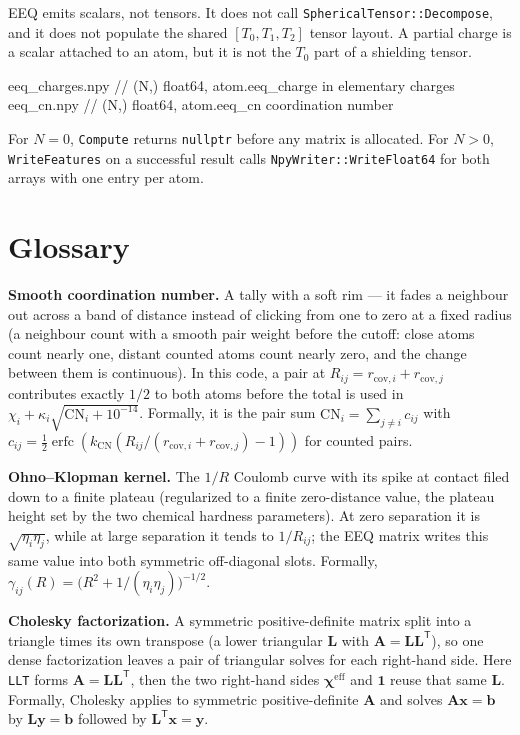 \documentclass[11pt]{article}
\newcommand{\code}[1]{\texttt{#1}}
\begin{document}
EEQ emits scalars, not tensors. It does not call
\code{SphericalTensor::Decompose}, and it does not populate the shared
\([T_0,T_1,T_2]\) tensor layout. A partial charge is a scalar attached to an
atom, but it is not the \(T_0\) part of a shielding tensor.

\begin{codebox}
eeq_charges.npy  // (N,) float64, atom.eeq_charge in elementary charges
eeq_cn.npy       // (N,) float64, atom.eeq_cn coordination number
\end{codebox}

For \(N=0\), \code{Compute} returns \code{nullptr} before any matrix is
allocated. For \(N>0\), \code{WriteFeatures} on a successful result calls
\code{NpyWriter::WriteFloat64} for both arrays with one entry per atom.

\section{Glossary}

\textbf{Smooth coordination number.} A tally with a soft rim --- it fades a
neighbour out across a band of distance instead of clicking from one to zero at
a fixed radius (a neighbour count with a smooth pair weight before the cutoff:
close atoms count nearly one, distant counted atoms count nearly zero, and the
change between them is continuous). In this code, a
pair at
\(R_{ij}=r_{\mathrm{cov},i}+r_{\mathrm{cov},j}\) contributes exactly \(1/2\) to
both atoms before the total is used in \(\chi_i+\kappa_i\sqrt{\mathrm{CN}_i+
10^{-14}}\). Formally, it is the pair sum
\(\mathrm{CN}_i=\sum_{j\ne i}c_{ij}\) with
\(c_{ij}=\frac12\operatorname{erfc}(k_{\mathrm{CN}}
(R_{ij}/(r_{\mathrm{cov},i}+r_{\mathrm{cov},j})-1))\) for counted pairs.

\textbf{Ohno--Klopman kernel.} The \(1/R\) Coulomb curve with its spike at
contact filed down to a finite plateau (regularized to a finite zero-distance
value, the plateau height set by the two chemical hardness parameters). At zero
separation it is \(\sqrt{\eta_i\eta_j}\), while at large separation it tends to
\(1/R_{ij}\); the EEQ matrix writes this same value into both symmetric
off-diagonal slots. Formally,
\(\gamma_{ij}(R)=\big(R^2+1/(\eta_i\eta_j)\big)^{-1/2}\).

\textbf{Cholesky factorization.} A symmetric positive-definite matrix split into
a triangle times its own transpose (a lower triangular \(\bm L\) with
\(\bm A=\bm L\bm L^{\mathsf T}\)), so one dense factorization leaves a pair of
triangular solves for each right-hand side. Here
\code{LLT} forms \(\bm A=\bm L\bm L^{\mathsf T}\), then the two right-hand
sides \(\bm\chi^{\mathrm{eff}}\) and \(\bm1\) reuse that same \(\bm L\).
Formally, Cholesky applies to symmetric positive-definite \(\bm A\) and solves
\(\bm A\bm x=\bm b\) by \(\bm L\bm y=\bm b\) followed by
\(\bm L^{\mathsf T}\bm x=\bm y\).
\end{document}
